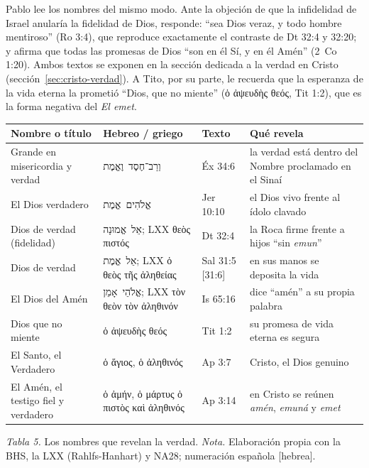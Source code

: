 \documentclass[11pt,letterpaper]{article}
\newcommand{\heb}[1]{\mbox{\foreignlanguage{hebrew}{#1}}}
\newcommand{\grc}[1]{\foreignlanguage{ancientgreek}{#1}}
\begin{document}
Pablo lee los nombres del mismo modo. Ante la objeción de que la infidelidad de Israel anularía la fidelidad de Dios, responde: ``sea Dios veraz, y todo hombre mentiroso'' (Ro 3:4), que reproduce exactamente el contraste de Dt 32:4 y 32:20; y afirma que todas las promesas de Dios ``son en él Sí, y en él Amén'' (2~Co 1:20). Ambos textos se exponen en la sección dedicada a la verdad en Cristo (sección~\ref{sec:cristo-verdad}). A Tito, por su parte, le recuerda que la esperanza de la vida eterna la prometió ``Dios, que no miente'' (\grc{ὁ ἀψευδὴς θεός}, Tit 1:2), que es la forma negativa del \emph{El emet}.

\begin{center}\small\renewcommand{\arraystretch}{1.22}
\begin{tabular}{@{}L{3.3cm}L{3.7cm}L{2.4cm}L{5.0cm}@{}}
\toprule
\textbf{Nombre o título} & \textbf{Hebreo / griego} & \textbf{Texto} & \textbf{Qué revela} \\ \midrule
Grande en misericordia y verdad & \heb{וְרַב־חֶסֶד וֶאֱמֶת} & Éx 34:6 & la verdad está dentro del Nombre proclamado en el Sinaí \\
El Dios verdadero & \heb{אֱלֹהִים אֱמֶת} & Jer 10:10 & el Dios vivo frente al ídolo clavado \\
Dios de verdad (fidelidad) & \heb{אֵל אֱמוּנָה}; LXX \grc{θεὸς πιστός} & Dt 32:4 & la Roca firme frente a hijos ``sin \emph{emun}'' \\
Dios de verdad & \heb{אֵל אֱמֶת}; LXX \grc{ὁ θεὸς τῆς ἀληθείας} & Sal 31:5 [31:6] & en sus manos se deposita la vida \\
El Dios del Amén & \heb{אֱלֹהֵי אָמֵן}; LXX \grc{τὸν θεὸν τὸν ἀληθινόν} & Is 65:16 & dice ``amén'' a su propia palabra \\
Dios que no miente & \grc{ὁ ἀψευδὴς θεός} & Tit 1:2 & su promesa de vida eterna es segura \\
El Santo, el Verdadero & \grc{ὁ ἅγιος, ὁ ἀληθινός} & Ap 3:7 & Cristo, el Dios genuino \\
El Amén, el testigo fiel y verdadero & \grc{ὁ ἀμήν, ὁ μάρτυς ὁ πιστὸς καὶ ἀληθινός} & Ap 3:14 & en Cristo se reúnen \emph{amén}, \emph{emuná} y \emph{emet} \\
\bottomrule
\end{tabular}\par
{\footnotesize\color{gris}\textit{Tabla 5.} Los nombres que revelan la verdad. \textit{Nota.} Elaboración propia con la BHS, la LXX (Rahlfs-Hanhart) y NA28; numeración española [hebrea].}
\end{center}
\end{document}
